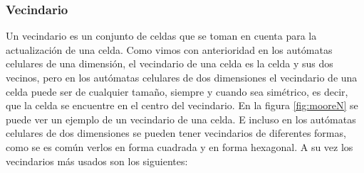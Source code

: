 \subsubsection{Vecindario}
    \label{sec:Vecindario}
    Un vecindario es un conjunto de celdas que se toman en cuenta para la actualizaci\'on de una celda. Como vimos con anterioridad
        en los aut\'omatas celulares de una dimensi\'on, el vecindario de una celda es la celda y sus dos vecinos, pero en los aut\'omatas
        celulares de dos dimensiones el vecindario de una celda puede ser de cualquier tama\~no, siempre y cuando sea sim\'etrico, es decir,
        que la celda se encuentre en el centro del vecindario. En la figura \ref{fig:mooreN} se puede ver un ejemplo de un vecindario
        de una celda. E incluso en los aut\'omatas celulares de dos dimensiones se pueden tener vecindarios de diferentes formas, como se
        es com\'un verlos en forma cuadrada y en forma hexagonal.
    \vskip 0.5cm
    A su vez los vecindarios m\'as usados son los siguientes: 
